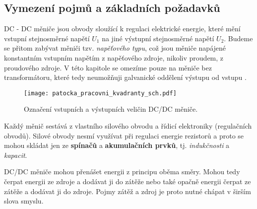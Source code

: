       

    \subsection{Vymezení pojmů a základních požadavků}\label{aes:sec012}
      DC - DC měniče jsou obvody sloužící k regulaci elektrické energie, které mění vstupní
      stejnosměrné napětí \(U_1\) na jiné výstupní stejnosměrné napětí \(U_2\). Budeme se přitom 
      zabývat měniči tzv. \emph{napěťového typu}, což jsou měniče napájené konstantním vstupním 
      napětím z napěťového zdroje, nikoliv proudem, z proudového zdroje. V této kapitole se omezíme 
      pouze na měniče bez transformátoru, které tedy neumožňuji galvanické oddělení výstupu od 
      vstupu \cite{Patocka}.
      
      \begin{figure}[ht!]
        \centering
        \texttt{[image: patocka\_pracovni\_kvadranty\_sch.pdf]}
        \caption{Označení vstupních a výstupních veličin DC/DC měniče.}
        \label{enz:fig_005}
      \end{figure}
      
      Každý měnič sestává z vlastního silového obvodu a řídicí elektroniky (regulačních obvodů).
      Silové obvody nesmí využívat při regulaci energie rezistorů a proto se mohou skládat jen ze
      \textbf{spínačů} a \textbf{akumulačních prvků}, tj. \emph{indukčnosti} a \emph{kapacit}.
      
      DC/DC měniče mohou přenášet energii z principu oběma směry. Mohou tedy čerpat energii ze
      zdroje a dodávat ji do zátěže nebo také opačně energii čerpat ze zátěže a dodávat ji do
      zdroje. Pojmy zátěž a zdroj je proto nutné chápat v širším slova smyslu.
      
